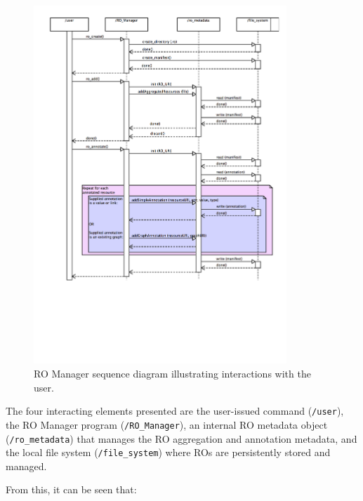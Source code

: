 \begin{figure}
\begin{center}
\includegraphics[width=0.85\textwidth]{Figures/RO_Manager_seq.png}
\end{center}
\caption{RO Manager sequence diagram illustrating interactions with the user.}
\label{fig:romanagersequencediagram}
\end{figure}


The four interacting elements presented are the user-issued command (\texttt{/user}), the RO Manager program (\texttt{/RO\_Manager}), an internal RO metadata object (\texttt{/ro\_metadata}) that manages the RO aggregation and annotation metadata, and the local file system (\texttt{/file\_system}) where ROs are persistently stored and managed.

From this, it can be seen that:

